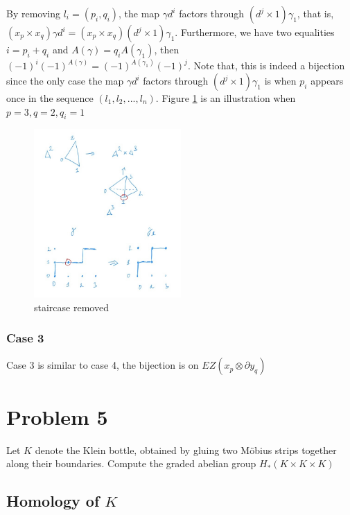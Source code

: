 \documentclass{article}
\begin{document}
By removing $l_i = (p_i, q_i)$, the map $\gamma d^i$ factors through $(d^j \times 1) \gamma_1$, that is, $(x_p \times x_q) \gamma d^i = (x_p \times x_q) (d^j \times 1) \gamma_1$. Furthermore, we have two equalities $i = p_i + q_i$ and $A(\gamma) = q_i A(\gamma_1)$, then $(-1)^i (-1)^{A(\gamma)} = (-1)^{A(\gamma_1)} (-1)^j$. Note that, this is indeed a bijection since the only case the map $\gamma d^i$ factors through $(d^j \times 1) \gamma_1$ is when $p_i$ appears once in the sequence $(l_1, l_2, ..., l_n)$. Figure \ref{fig_staircase_removed} is an illustration when $p=3, q=2, q_i = 1$

\begin{figure}[h]
\centering
\includegraphics[width=0.5\textwidth]{staircase_removed.jpg}
\caption{staircase removed}
\label{fig_staircase_removed}
\end{figure}

\subsubsection{Case 3}

Case 3 is similar to case 4, the bijection is on $EZ(x_p \otimes \partial y_q)$


\section{Problem 5}

Let $K$ denote the Klein bottle, obtained by gluing two Möbius strips together along their boundaries. Compute the graded abelian group $H_*(K \times K \times K)$

\subsection{Homology of $K$}
\end{document}

